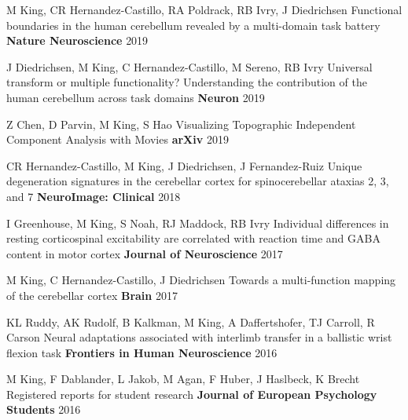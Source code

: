 \begin{cventries}
\begin{cventries}
  \cventry
    {M King, CR Hernandez-Castillo, RA Poldrack, RB Ivry, J Diedrichsen} %
    {Functional boundaries in the human cerebellum revealed by a multi-domain task battery} %
    {\textbf{Nature Neuroscience}} %
    {2019} %
    {}
    
  \cventry
    {J Diedrichsen, M King, C Hernandez-Castillo, M Sereno, RB Ivry} %
    {Universal transform or multiple functionality? Understanding the contribution of the human cerebellum across task domains} %
    {\textbf{Neuron}} %
    {2019} %
    {}
    
  \cventry
    {Z Chen, D Parvin, M King, S Hao} %
    {Visualizing Topographic Independent Component Analysis with Movies} %
    {\textbf{arXiv}} %
    {2019} %
    {}
    
  \cventry
    {CR Hernandez-Castillo, M King, J Diedrichsen, J Fernandez-Ruiz} %
    {Unique degeneration signatures in the cerebellar cortex for spinocerebellar ataxias 2, 3, and 7} %
    {\textbf{NeuroImage: Clinical}} %
    {2018} %
    {}
    
  \cventry
    {I Greenhouse, M King, S Noah, RJ Maddock, RB Ivry} %
    {Individual differences in resting corticospinal excitability are correlated with reaction time and GABA content in motor cortex} %
    {\textbf{Journal of Neuroscience}} %
    {2017} %
    {}
    
  \cventry
    {M King, C Hernandez-Castillo, J Diedrichsen} %
    {Towards a multi-function mapping of the cerebellar cortex} %
    {\textbf{Brain}} %
    {2017} %
    {}
    
  \cventry
    {KL Ruddy, AK Rudolf, B Kalkman, M King, A Daffertshofer, TJ Carroll, R Carson} %
    {Neural adaptations associated with interlimb transfer in a ballistic wrist flexion task} %
    {\textbf{Frontiers in Human Neuroscience}} %
    {2016} %
    {}
    
  \cventry
    {M King, F Dablander, L Jakob, M Agan, F Huber, J Haslbeck, K Brecht} %
    {Registered reports for student research} %
    {\textbf{Journal of European Psychology Students}} %
    {2016} %
    {}
    

\end{cventries}
\end{cventries}
